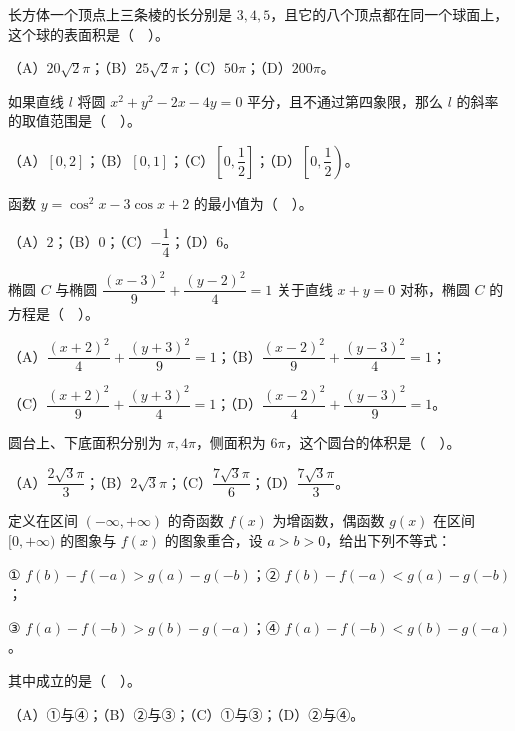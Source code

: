 \begin{question}
长方体一个顶点上三条棱的长分别是 $3,4,5$，且它的八个顶点都在同一个球面上，这个球的表面积是（　）。

（A）$20\sqrt2\pi$；（B）$25\sqrt2\pi$；（C）$50\pi$；（D）$200\pi$。

\end{question}
\begin{question}
如果直线 $l$ 将圆 $x^2+y^2-2x-4y=0$ 平分，且不通过第四象限，那么 $l$ 的斜率的取值范围是（　）。

（A）$[0,2]$；（B）$[0,1]$；（C）$\left[0,\dfrac12\right]$；（D）$\left[0,\dfrac12\right)$。

\end{question}
\begin{question}
函数 $y=\cos^2x-3\cos x+2$ 的最小值为（　）。

（A）$2$；（B）$0$；（C）$-\dfrac14$；（D）$6$。

\end{question}
\begin{question}
椭圆 $C$ 与椭圆 $\dfrac{(x-3)^2}{9}+\dfrac{(y-2)^2}{4}=1$ 关于直线 $x+y=0$ 对称，椭圆 $C$ 的方程是（　）。

（A）$\dfrac{(x+2)^2}{4}+\dfrac{(y+3)^2}{9}=1$；（B）$\dfrac{(x-2)^2}{9}+\dfrac{(y-3)^2}{4}=1$；

（C）$\dfrac{(x+2)^2}{9}+\dfrac{(y+3)^2}{4}=1$；（D）$\dfrac{(x-2)^2}{4}+\dfrac{(y-3)^2}{9}=1$。

\end{question}
\begin{question}
圆台上、下底面积分别为 $\pi,4\pi$，侧面积为 $6\pi$，这个圆台的体积是（　）。

（A）$\dfrac{2\sqrt3\pi}{3}$；（B）$2\sqrt3\pi$；（C）$\dfrac{7\sqrt3\pi}{6}$；（D）$\dfrac{7\sqrt3\pi}{3}$。

\end{question}
\begin{question}
定义在区间 $(-\infty,+\infty)$ 的奇函数 $f(x)$ 为增函数，偶函数 $g(x)$ 在区间 $[0,+\infty)$ 的图象与 $f(x)$ 的图象重合，设 $a>b>0$，给出下列不等式：

① $f(b)-f(-a)>g(a)-g(-b)$；② $f(b)-f(-a)<g(a)-g(-b)$；

③ $f(a)-f(-b)>g(b)-g(-a)$；④ $f(a)-f(-b)<g(b)-g(-a)$。

其中成立的是（　）。

（A）①与④；（B）②与③；（C）①与③；（D）②与④。

\end{question}
